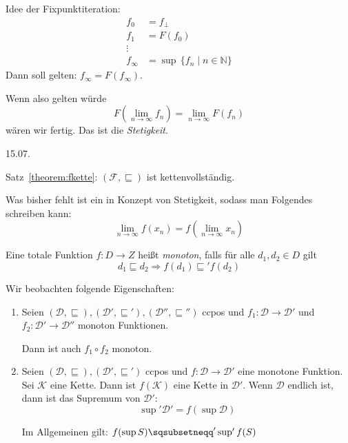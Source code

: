 Idee der Fixpunktiteration: \begin{align*}
    f_0 & = f_{\bot} \\
    f_1 & = F(f_0) \\
    \vdots \\
    f_{\infty} & = \sup \, \{ f_n \mid n \in \mathbb{N} \}
\end{align*}
Dann soll gelten: $f_{\infty} = F(f_{\infty})$.

Wenn also gelten würde \[
    F\left(\lim_{n \to \infty} f_n\right) = \lim_{n \to \infty} F(f_n)
\] wären wir fertig. Das ist die \emph{Stetigkeit}.



\newpage
\hfill 15.07.

\begin{remark}
    Satz~\ref{theorem:fkette}: $(\mathcal{F}, \sqsubseteq)$ ist kettenvollständig.

    Was bisher fehlt ist ein in Konzept von Stetigkeit, sodass man Folgendes schreiben kann: \[
        \lim_{n \to \infty} f(x_n) = f\left(\lim_{n \to \infty} x_n\right)
    \]
\end{remark}


\par\medskip
\begin{definition}[Monotonie]
    Eine totale Funktion $f: D \to Z$ heißt \emph{monoton}, falls für alle $d_1, d_2 \in D$ gilt \[
        d_1 \sqsubseteq d_2 \Rightarrow f(d_1) \sqsubseteq' f(d_2)
    \]
\end{definition}

\begin{observations}
    Wir beobachten folgende Eigenschaften:
    \begin{enumerate}
        \item Seien $(\mathcal{D}, \sqsubseteq), (\mathcal{D}',\sqsubseteq'), (\mathcal{D}'',\sqsubseteq'')$ ccpos und $f_1: \mathcal{D} \to \mathcal{D}'$ und $f_2: \mathcal{D}' \to \mathcal{D}''$ monoton Funktionen.

            Dann ist auch $f_1 \circ f_2$ monoton.
        \item Seien $(\mathcal{D}, \sqsubseteq), (\mathcal{D}',\sqsubseteq')$ ccpos und $f: \mathcal{D} \to \mathcal{D}'$ eine monotone Funktion. Sei $\mathcal{K}$ eine Kette. Dann ist $f(\mathcal{K})$ eine Kette in $\mathcal{D}'$. Wenn $\mathcal{D}$ endlich ist, dann ist das Supremum von $\mathcal{D}'$: \[
                \sup' \mathcal{D}' = f(\sup \mathcal{D})
            \]

            Im Allgemeinen gilt: $f(\sup S) \sqsubsetneqq' \sup' f(S)$
    \end{enumerate}
\end{observations}


